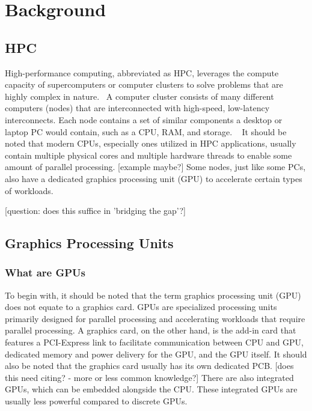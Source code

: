 
\chapter{Background}\label{chapter:Background}

\section{HPC}

High-performance computing, abbreviated as HPC, leverages the compute capacity of supercomputers or computer clusters to solve problems that are highly complex in nature.~\parencite{ibm_what_nodate} A computer cluster consists of many different computers (nodes) that are interconnected with high-speed, low-latency interconnects. Each node contains a set of similar components a desktop or laptop PC would contain, such as a CPU, RAM, and storage. ~\parencite{iowa_state_university_what_nodate} It should be noted that modern CPUs, especially ones utilized in HPC applications, usually contain multiple physical cores and multiple hardware threads to enable some amount of parallel processing. [example maybe?] Some nodes, just like some PCs, also have a dedicated graphics processing unit (GPU) to accelerate certain types of workloads. ~\parencite{iowa_state_university_what_nodate}
 
  
 [question: does this suffice in 'bridging the gap'?]
 
 
 \section{Graphics Processing Units}
 
 
 \subsection{What are GPUs}
 To begin with, it should be noted that the term graphics processing unit (GPU) does not equate to a graphics card. GPUs are specialized processing units primarily designed for parallel processing and accelerating workloads that require parallel processing. \cite{intel_what_nodate} A graphics card, on the other hand, is the add-in card that features a PCI-Express link to facilitate communication between CPU and GPU, dedicated memory and power delivery for the GPU, and the GPU itself. It should also be noted that the graphics card usually has its own dedicated PCB. [does this need citing? - more or less common knowledge?] There are also integrated GPUs, which can be embedded alongside the CPU.  These integrated GPUs are usually less powerful compared to discrete GPUs. \cite{intel_what_nodate}


